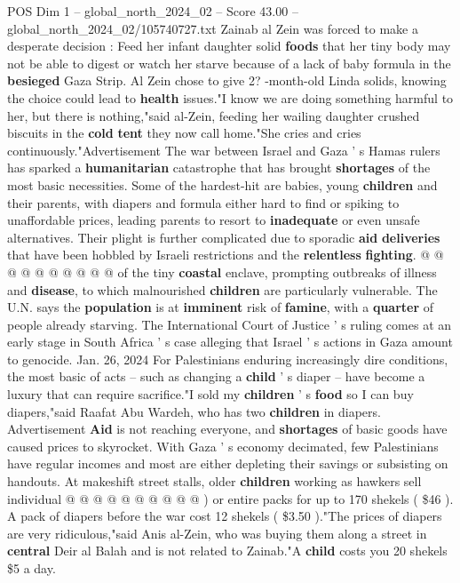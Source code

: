 \begin{textsample}{POS Dim 1 – global\_north\_2024\_02 – Score 43.00 – global\_north\_2024\_02/105740727.txt}  \label{ex:f1_pos_095}
Zainab al Zein was forced to make a desperate decision : Feed her infant daughter solid \textbf{foods} that her tiny body may not be able to digest or watch her starve because of a lack of baby formula in the \textbf{besieged} Gaza Strip.
Al Zein chose to give 2? -month-old Linda solids, knowing the choice could lead to \textbf{health} issues."I know we are doing something harmful to her, but there is nothing,"said al-Zein, feeding her wailing daughter crushed biscuits in the \textbf{cold} \textbf{tent} they now call home."She cries and cries continuously."Advertisement The war between Israel and Gaza ' s Hamas rulers has sparked a \textbf{humanitarian} catastrophe that has brought \textbf{shortages} of the most basic necessities.
Some of the hardest-hit are babies, young \textbf{children} and their parents, with diapers and formula either hard to find or spiking to unaffordable prices, leading parents to resort to \textbf{inadequate} or even unsafe alternatives.
Their plight is further complicated due to sporadic \textbf{aid} \textbf{deliveries} that have been hobbled by Israeli restrictions and the \textbf{relentless} \textbf{fighting}. @ @ @ @ @ @ @ @ @ @ of the tiny \textbf{coastal} enclave, prompting outbreaks of illness and \textbf{disease}, to which malnourished \textbf{children} are particularly vulnerable.
The U.N. says the \textbf{population} is at \textbf{imminent} risk of \textbf{famine}, with a \textbf{quarter} of people already starving.
The International Court of Justice ' s ruling comes at an early stage in South Africa ' s case alleging that Israel ' s actions in Gaza amount to genocide.
Jan. 26, 2024 For Palestinians enduring increasingly dire conditions, the most basic of acts -- such as changing a \textbf{child} ' s diaper -- have become a luxury that can require sacrifice."I sold my \textbf{children} ' s \textbf{food} so I can buy diapers,"said Raafat Abu Wardeh, who has two \textbf{children} in diapers.
Advertisement \textbf{Aid} is not reaching everyone, and \textbf{shortages} of basic goods have caused prices to skyrocket.
With Gaza ' s economy decimated, few Palestinians have regular incomes and most are either depleting their savings or subsisting on handouts.
At makeshift street stalls, older \textbf{children} working as hawkers sell individual @ @ @ @ @ @ @ @ @ @ ) or entire packs for up to 170 shekels ( \$46 ).
A pack of diapers before the war cost 12 shekels ( \$3.50 )."The prices of diapers are very ridiculous,"said Anis al-Zein, who was buying them along a street in \textbf{central} Deir al Balah and is not related to Zainab."A \textbf{child} costs you 20 shekels \$5 a day.

\end{textsample}
